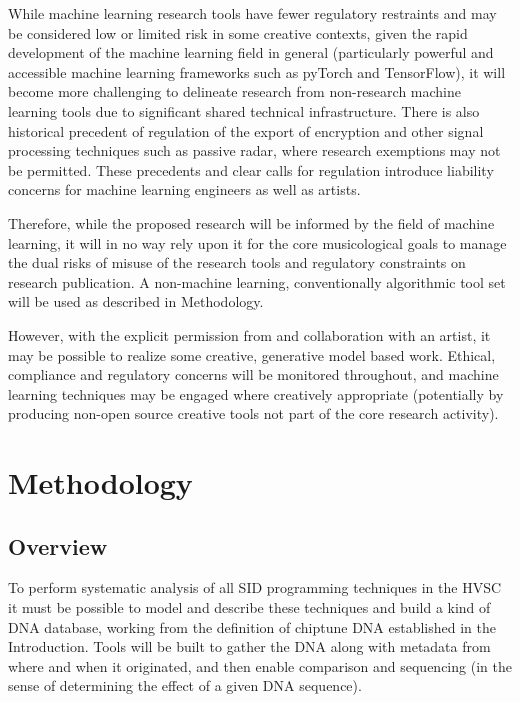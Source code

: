 \documentclass[10pt]{article}
\begin{document}
\begin{multicols*}{2}
While machine learning research tools have fewer regulatory restraints and may be considered low or limited risk in some creative contexts, given the rapid development of the machine learning field in general (particularly powerful and accessible machine learning frameworks such as pyTorch and TensorFlow), it will become more challenging to delineate research from non-research machine learning tools due to significant shared technical infrastructure. There is also historical precedent of regulation of the export of encryption and other signal processing techniques such as passive radar\cite{munitions}, where research exemptions may not be permitted. These precedents and clear calls for regulation introduce liability concerns for machine learning engineers as well as artists.

Therefore, while the proposed research will be informed by the field of machine learning, it will in no way rely upon it for the core musicological goals to manage the dual risks of misuse of the research tools and regulatory constraints on research publication. A non-machine learning, conventionally algorithmic tool set will be used as described in Methodology.

However, with the explicit permission from and collaboration with an artist, it may be possible to realize some creative, generative model based work. Ethical, compliance and regulatory concerns will be monitored throughout, and machine learning techniques may be engaged where creatively appropriate (potentially by producing non-open source creative tools not part of the core research activity).

\section{Methodology}
\label{methodology}

    \subsection{Overview}

To perform systematic analysis of all SID programming techniques in the HVSC it must be possible to model and describe these techniques and build a kind of DNA database, working from the definition of chiptune DNA established in the Introduction. Tools will be built to gather the DNA along with metadata from where and when it originated, and then enable comparison and sequencing (in the sense of determining the effect of a given DNA sequence).


\end{multicols*}
\end{document}
